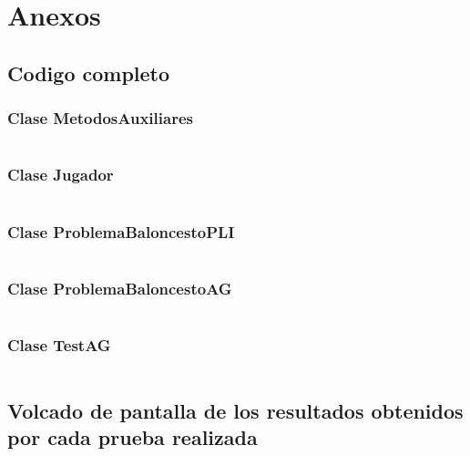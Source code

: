 \documentclass[a4paper,12pt]{article}
\begin{document}
\section{Anexos}
\subsection{Codigo completo}
\subsubsection{Clase MetodosAuxiliares}
\inputminted[fontsize=\footnotesize,breaklines]{java}{src/andalu30/PracticaIndividual1/MetodosAuxiliares.java}

\subsubsection{Clase Jugador}
\inputminted[fontsize=\footnotesize,breaklines]{java}{src/andalu30/PracticaIndividual1/Jugador.java}

\subsubsection{Clase ProblemaBaloncestoPLI}
\inputminted[fontsize=\footnotesize,breaklines]{java}{src/andalu30/PracticaIndividual1/ProblemaBaloncestoPLI.java}

\subsubsection{Clase ProblemaBaloncestoAG}
\inputminted[fontsize=\footnotesize,breaklines]{java}{src/andalu30/PracticaIndividual1/ProblemaBaloncestoAG.java}

\subsubsection{Clase TestAG}
\inputminted[fontsize=\footnotesize,breaklines]{java}{src/andalu30/PracticaIndividual1/TestAG.java}

\subsection{Volcado de pantalla de los resultados obtenidos por cada prueba realizada}
\end{document}
